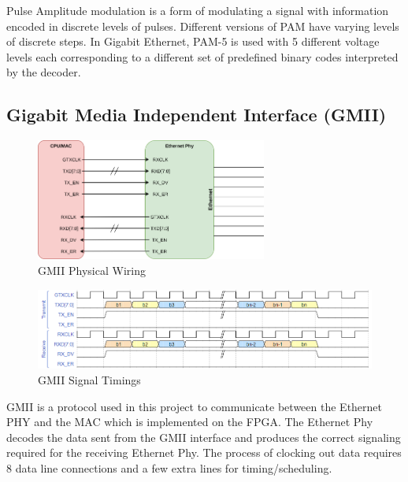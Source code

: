 \par Pulse Amplitude modulation is a form of modulating a signal with information encoded in discrete levels of pulses.
Different versions of PAM have varying levels of discrete steps. In Gigabit Ethernet, PAM-5 is used with 5 
different voltage levels each corresponding to a different set of predefined binary codes interpreted by the 
decoder.

\subsection{Gigabit Media Independent Interface (GMII)}

\begin{figure}[H]
    \begin{center}
        \includegraphics[keepaspectratio,height=4cm]{Images/GMIIWiring}
        \caption{GMII Physical Wiring}
        \label{fig:gmiiwiring}
    \end{center}
\end{figure}

\begin{figure}[H]
    \begin{center}
        \includegraphics[keepaspectratio,width=15cm]{Images/GMIISignaling}
        \caption{GMII Signal Timings}
        \label{fig:gmiisignals}
    \end{center}
\end{figure}

\par GMII is a protocol used in this project to communicate between the Ethernet PHY and the MAC which is implemented 
on the FPGA. The Ethernet Phy decodes the data sent from the GMII interface and produces the correct signaling 
required for the receiving Ethernet Phy. The process of clocking out data requires 8 data line connections 
and a few extra lines for timing/scheduling.

